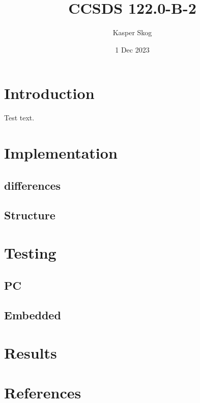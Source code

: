 \documentclass[12pt, a4paper]{article}
\title{CCSDS 122.0-B-2}
\author{Kasper Skog}
\date{1 Dec 2023}
\begin{document}
\maketitle
\tableofcontents

\newpage

\section{Introduction}
Test text\cite{test}.
\section{Implementation}
\subsection{differences}
\subsection{Structure}
\section{Testing}
\subsection{PC}
\subsection{Embedded}
\section{Results}

\section{References}
\listoffigures


\end{document}
